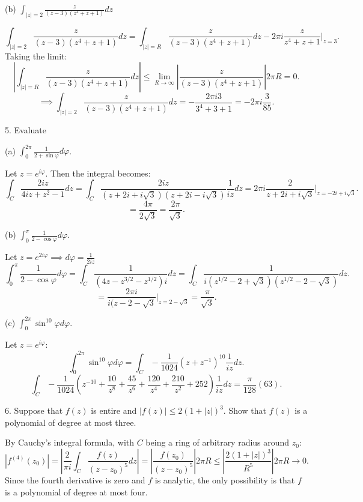 \documentclass[letterpaper, reqno,11pt]{article}
\begin{document}
(b) $ \int_{|z|=2} \frac{z}{ (z-3) (z^4+z+1)} dz $

\[
\int_{|z|=2} \frac{z}{ (z-3) (z^4+z+1)} dz=\int_{|z|=R} \frac{z}{ (z-3) (z^4+z+1)} dz-2\pi i\frac{z}{z^{4}+z+1}\bigg|_{z=3}
.\]
Taking the limit: 
\[
\left| \int_{|z|=R} \frac{z}{ (z-3) (z^4+z+1)} dz \right| \leq \lim_{R\to \infty}\left|\frac{z}{ (z-3) (z^4+z+1)}\right|2\pi R=0
.\]
\[
\implies \int_{|z|=2} \frac{z}{ (z-3) (z^4+z+1)} dz=-\frac{2\pi i3}{3^{4}+3+1}=-2\pi i\frac{3}{85}
.\]


\medskip

5. Evaluate

(a) $ \int_0^{2\pi} \frac{1}{2+\sin\varphi} d \varphi $.  

Let $z=e^{i\varphi}$. Then the integral becomes: 
\[
\int_C \frac{2iz}{4iz+z^2-1}dz=\int_C \frac{2iz}{(z+2i+i\sqrt{3})(z+2i-i\sqrt{3})}\frac{1}{iz}dz=2\pi i \frac{2}{z+2i+i\sqrt{3}}\bigg|_{z=-2i+i\sqrt{3}}
.\]
\[
=\frac{4\pi }{2\sqrt{3} }=\frac{2\pi}{\sqrt{3} }
.\]

(b) $ \int_0^\pi \frac{ 1}{ 2-\cos \varphi} d \varphi$. 

Let $z=e^{2i\varphi}\implies d\varphi=\frac{1}{2iz}$
\[
\int_0^\pi \frac{ 1}{ 2-\cos \varphi} d\varphi=\int_C \frac{1}{(4z-z^{3 /2}-z^{1 /2})i}dz=\int_C \frac{1}{i\left( z^{1 /2}-2+\sqrt{3}  \right)\left( z^{1 /2}-2-\sqrt{3}  \right)  }dz
.\]
\[
=\frac{2\pi i}{i(z-2-\sqrt{3} }\bigg|_{z=2-\sqrt{3}}=\frac{\pi}{\sqrt{3} }
.\]

(c) $\int_0^{2\pi} \sin^{10} \varphi d \varphi $.

Let $z=e^{i\varphi}$: 
\[
\int_0^{2\pi} \sin^{10} \varphi d \varphi=\int_C -\frac{1}{1024}\left( z+z^{-1} \right)^{10}\frac{1}{iz}dz
.\]
\[
\int_C -\frac{1}{1024}\left( z^{-10}+\frac{10}{z^{8}}+\frac{45}{z^{6}}+\frac{120}{z^{4}}+\frac{210}{z^2}+252 \right)\frac{1}{iz}dz=\frac{\pi}{128}\left( 63 \right) 
.\]

\medskip

6. Suppose that $ f(z)$ is entire and $ |f(z)| \leq 2 (1+|z|)^3$. Show that $ f(z)$ is a polynomial of degree at most three.

By Cauchy's integral formula, with $C$ being a ring of arbitrary radius around $z_0$: 
\[
|f^{(4)}(z_0)|=\left|\frac{2}{\pi i}\int_C \frac{f(z)}{(z-z_0)^{5}}dz\right|= |\frac{f(z_0)}{(z-z_0)^{5}}|2\pi R\leq  |\frac{2(1+|z|)^3}{R^{5}}|2\pi R\to 0
.\]
Since the fourth derivative is zero and $f$ is analytic, the only possibility is that $f$ is a polynomial of degree at most four. 

\end{document}
